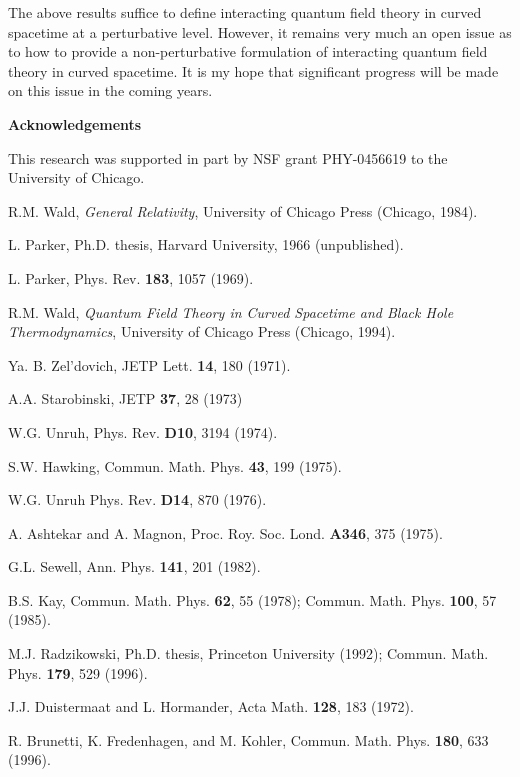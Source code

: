 \documentclass[12pt,epsf,amsfonts,amssymb]{article}
\begin{document}
The above results suffice to define interacting quantum field theory
in curved spacetime at a perturbative level. However, it remains very
much an open issue as to how to provide a non-perturbative formulation
of interacting quantum field theory in curved spacetime. It is my hope
that significant progress will be made on this issue in the coming years.

\bigskip 
\begin{center}
{\bf Acknowledgements} 
\end{center}
This research was supported in part by NSF grant PHY-0456619 to the
University of Chicago.

\begin{thebibliography}{99} 

 R.M. Wald, {\it General Relativity},
University of Chicago Press (Chicago, 1984).

 L. Parker, Ph.D. thesis, Harvard University, 1966 (unpublished).

 L. Parker, Phys. Rev. {\bf 183}, 1057 (1969).

 R.M. Wald, {\it Quantum Field Theory in Curved Spacetime and
Black Hole Thermodynamics}, University of Chicago Press (Chicago, 1994).

 Ya. B. Zel'dovich, JETP Lett. {\bf 14}, 180 (1971).

 A.A. Starobinski, JETP {\bf 37}, 28 (1973)

 W.G. Unruh, Phys. Rev. {\bf D10}, 3194 (1974).

 S.W. Hawking, Commun. Math. Phys. {\bf 43}, 199 (1975).

 W.G. Unruh Phys. Rev. {\bf D14}, 870 (1976).

 A. Ashtekar and A. Magnon, Proc. Roy. Soc. Lond. {\bf
A346}, 375 (1975).

 G.L. Sewell, Ann. Phys. {\bf 141}, 201 (1982).

 B.S. Kay, Commun. Math. Phys. {\bf 62}, 55 (1978);
Commun. Math. Phys. {\bf 100}, 57 (1985).

 M.J. Radzikowski, Ph.D. thesis, Princeton University (1992);
Commun. Math. Phys. {\bf 179}, 529 (1996).

 J.J. Duistermaat and L. Hormander, Acta Math. {\bf 128},
183 (1972).

 R. Brunetti, K. Fredenhagen, and M. Kohler,
Commun. Math. Phys. {\bf 180}, 633 (1996).


\end{thebibliography}
\end{document}
